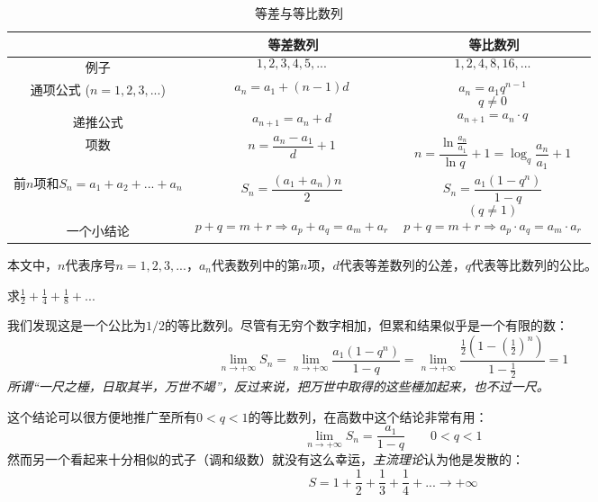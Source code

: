 

\begin{table}[ht]
\centering
\caption{等差与等比数列}\label{tab_AGS1}
\begin{tabular}{|c|c|c|}
\hline
 & 等差数列 & 等比数列 \\
\hline
例子 & $$1,2,3,4,5,...~$$ & $$1,2,4,8,16,...~$$ \\
\hline
通项公式 ($n=1,2,3,...$) & $$a_n = a_1 + (n-1)d~$$ & $$a_n = a_1 q^{n-1}~$$ $$q\ne0~$$ \\
\hline
递推公式 & $$a_{n+1} = a_n + d~$$ & $$a_{n+1} = a_n \cdot q~$$ \\
\hline
项数& $$n = \frac{a_n-a_1}{d} + 1~$$ & $$n = \frac{\ln{\frac{a_n}{a_1}}}{\ln{q}} + 1 = \log_q \frac{a_n}{a_1}+1~$$ \\
\hline
前$n$项和$S_n=a_1+a_2+...+a_n$& $$S_n=\frac{(a_1+a_n)n}{2}~$$ & $$S_n = \frac{a_1 (1-q^n)}{1-q}~$$ $$(q\ne 1)~$$ \\
\hline
一个小结论 & $$p+q=m+r \Rightarrow a_p+a_q = a_m + a_r~$$ & $$p+q=m+r \Rightarrow a_p \cdot a_q = a_m \cdot a_r~$$ \\
\hline
\end{tabular}
\end{table}

本文中，$n$代表序号$n=1,2,3,...$，$a_n$代表数列中的第$n$项，$d$代表等差数列的公差，$q$代表等比数列的公比。

\begin{example}{}
求$\frac{1}{2}+\frac{1}{4}+\frac{1}{8}+...$

我们发现这是一个公比为$1/2$的等比数列。尽管有无穷个数字相加，但累和结果似乎是一个有限的数：
$$\lim_{n \to +\infty} S_n =  \lim_{n \to +\infty} \frac{a_1 (1-q^n)}{1-q}
= \lim_{n \to +\infty} \frac{\frac{1}{2} (1-(\frac{1}{2})^n)}{1-\frac{1}{2}}
=1 ~$$
\textsl{所谓“一尺之棰，日取其半，万世不竭”，反过来说，把万世中取得的这些棰加起来，也不过一尺。}

这个结论可以很方便地推广至所有$0<q<1$的等比数列，在高数中这个结论非常有用：
$$\lim_{n \to +\infty} S_n =  \frac{a_1}{1-q} \qquad 0<q<1~$$
然而另一个看起来十分相似的式子（调和级数）就没有这么幸运，\textsl{主流理论}认为他是发散的：
$$S = 1+\frac{1}{2}+\frac{1}{3}+\frac{1}{4}+...\to+\infty~$$
\end{example}
